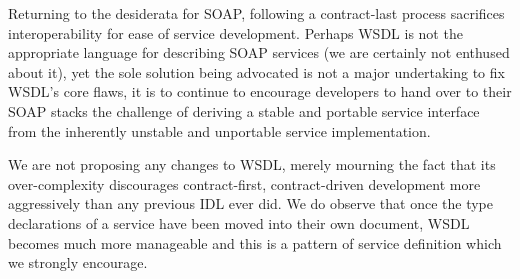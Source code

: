 Returning to the desiderata for SOAP, following a contract-last process
sacrifices interoperability for ease of service development. Perhaps
WSDL is not the appropriate language for describing SOAP services (we
are certainly not enthused about it), yet the sole solution being
advocated is not a major undertaking to fix WSDL's core flaws, it is
to continue to encourage developers to hand over to their SOAP stacks
the challenge of deriving a stable and portable service interface from
the inherently unstable and unportable service implementation.

We are not proposing any changes to WSDL, merely mourning the fact
that its over-complexity discourages contract-first, contract-driven
development more aggressively than any previous IDL ever did. We do
observe that once the type declarations of a service have been moved
into their own document, WSDL becomes much more manageable and this is
a pattern of service definition which we strongly encourage.

